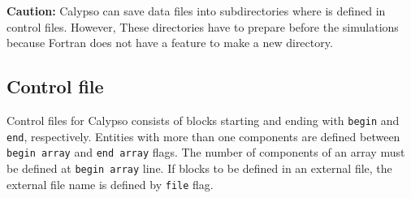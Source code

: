%

{\color{red} {\bf Caution:} Calypso can save data files into subdirectories where is defined in control files. However, These directories have to prepare before the simulations because Fortran does not have a feature to make a new directory.}

%
\newpage
\subsection{Control file}
Control files for Calypso consists of blocks starting and ending with \verb|begin| and \verb|end|, respectively. Entities with more than one components are defined between \verb|begin array| and \verb|end array| flags. The number of components of an array must be defined at \verb|begin array| line. If blocks to be defined in an external file, the external file name is defined by \verb|file| flag. 

